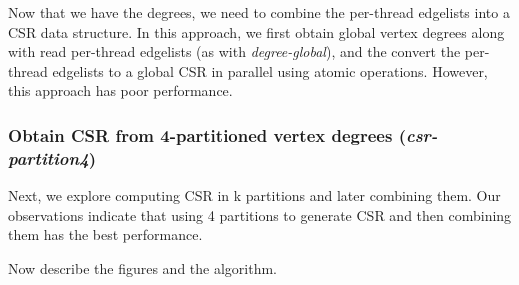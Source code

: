 Now that we have the degrees, we need to combine the per-thread edgelists into a CSR data structure. In this approach, we first obtain global vertex degrees along with read per-thread edgelists (as with \textit{degree-global}), and the convert the per-thread edgelists to a global CSR in parallel using atomic operations. However, this approach has poor performance.


\subsubsection{Obtain CSR from 4-partitioned vertex degrees (\textit{csr-partition4})}

Next, we explore computing CSR in k partitions and later combining them. Our observations indicate that using 4 partitions to generate CSR and then combining them has the best performance.

Now describe the figures and the algorithm.


